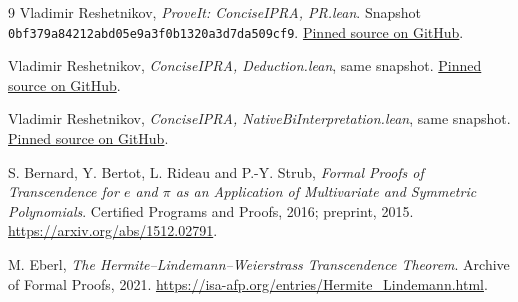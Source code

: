 \documentclass[11pt]{article}
\theoremstyle{definition}
\begin{document}
\begin{thebibliography}{9}
Vladimir Reshetnikov, \emph{ProveIt: ConciseIPRA, PR.lean}.
Snapshot \texttt{0bf379a84212abd05e9a3f0b1320a3d7da509cf9}.
\href{https://github.com/VladimirReshetnikov/ProveIt/blob/0bf379a84212abd05e9a3f0b1320a3d7da509cf9/Logic/PrimitiveRecursiveArithmetic/ConciseIPRA/Lean/ConciseIPRA/PR.lean}{Pinned source on GitHub}.

Vladimir Reshetnikov, \emph{ConciseIPRA, Deduction.lean}, same snapshot.
\href{https://github.com/VladimirReshetnikov/ProveIt/blob/0bf379a84212abd05e9a3f0b1320a3d7da509cf9/Logic/PrimitiveRecursiveArithmetic/ConciseIPRA/Lean/ConciseIPRA/Deduction.lean}{Pinned source on GitHub}.

Vladimir Reshetnikov, \emph{ConciseIPRA, NativeBiInterpretation.lean},
same snapshot.
\href{https://github.com/VladimirReshetnikov/ProveIt/blob/0bf379a84212abd05e9a3f0b1320a3d7da509cf9/Logic/PrimitiveRecursiveArithmetic/ConciseIPRA/Lean/ConciseIPRA/NativeBiInterpretation.lean}{Pinned source on GitHub}.

S. Bernard, Y. Bertot, L. Rideau and P.-Y. Strub,
\emph{Formal Proofs of Transcendence for \(e\) and \(\pi\) as an
Application of Multivariate and Symmetric Polynomials}.
Certified Programs and Proofs, 2016; preprint, 2015.
\url{https://arxiv.org/abs/1512.02791}.

M. Eberl, \emph{The Hermite--Lindemann--Weierstrass Transcendence
Theorem}. Archive of Formal Proofs, 2021.
\url{https://isa-afp.org/entries/Hermite_Lindemann.html}.
\end{thebibliography}
\end{document}

